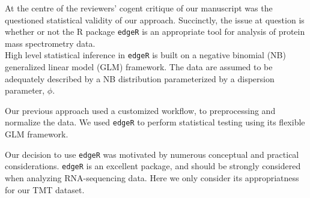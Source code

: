 \documentclass[12pt]{article}
\begin{document}
At the centre of the reviewers' cogent critique of our manuscript 
was the questioned statistical validity of our approach. Succinctly, 
the issue at question is whether or not the R package \texttt{edgeR}
is an appropriate tool for analysis of protein mass spectrometry data.\\

High level statistical inference in \texttt{edgeR} is built on a 
negative binomial (NB) generalized linear model (GLM) framework. 
The data are assumed to be adequately described by a NB distribution 
parameterized by a dispersion parameter, $\phi$. \footnotemark \\


Our previous approach used a customized workflow\footnotemark, to preprocessing
and normalize the data. We used \texttt{edgeR} to perform statistical testing  
using its flexible GLM framework.


Our decision to use \texttt{edgeR} was motivated by numerous 
conceptual and practical considerations. \texttt{edgeR} is an excellent package,
and should be strongly considered when analyzing RNA-sequencing data. Here we 
only consider its appropriatness for our TMT dataset.
\end{document}
